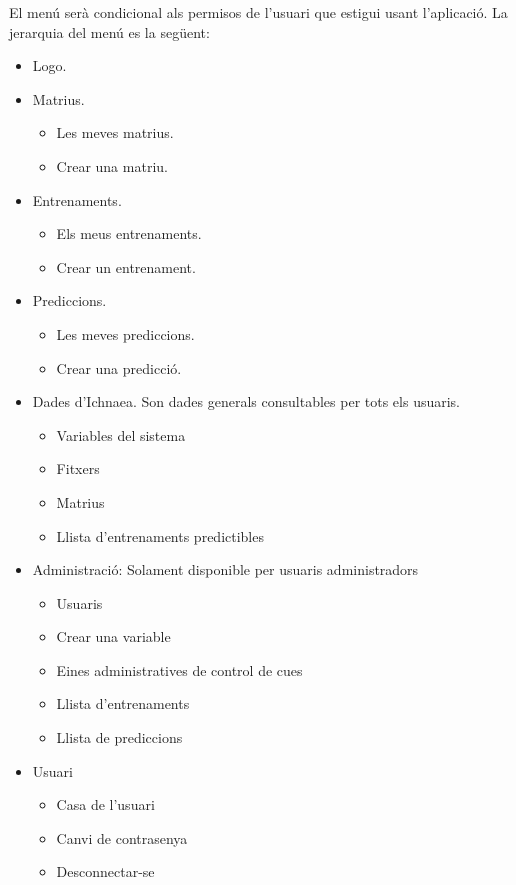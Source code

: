 \phantonsection
\label{menudessign}
El menú serà condicional als permisos de l'usuari que estigui usant l'aplicació. La jerarquia del menú es la següent:
\begin{itemize}
\item Logo.
\item Matrius.
 \begin{itemize}
 \item Les meves matrius.
 \item Crear una matriu.
  \end{itemize}
\item Entrenaments.
 \begin{itemize}
 \item Els meus entrenaments.
 \item Crear un entrenament.
 \end{itemize} 
\item Prediccions.
 \begin{itemize}
 \item Les meves prediccions.
 \item Crear una predicció.
 \end{itemize} 
\item Dades d'Ichnaea. Son dades generals consultables per tots els usuaris.
 \begin{itemize}
 \item Variables del sistema
 \item Fitxers
 \item Matrius
 \item Llista d'entrenaments predictibles
 \end{itemize} 
\item Administració: Solament disponible per usuaris administradors
\begin{itemize}
\item Usuaris
\item Crear una variable
\item Eines administratives de control de cues
\item Llista d'entrenaments
\item Llista de prediccions
\end{itemize}
\item Usuari
 \begin{itemize}
 \item Casa de l'usuari
 \item Canvi de contrasenya
 \item Desconnectar-se
 \end{itemize}
\end{itemize}

